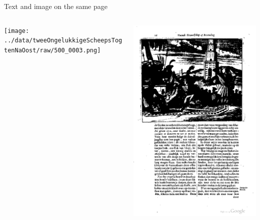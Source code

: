{
	Text and image on the same page
	\begin{columns}
		\begin{column}{.5\textwidth}
			\texttt{[image: ../data/tweeOngelukkigeScheepsTogtenNaOost/raw/500\_0003.png]}
		\end{column}
		\begin{column}{.5\textwidth}
			\includegraphics[width=.9\columnwidth]{resources/text_and_image_example}
		\end{column}
	\end{columns}
}


